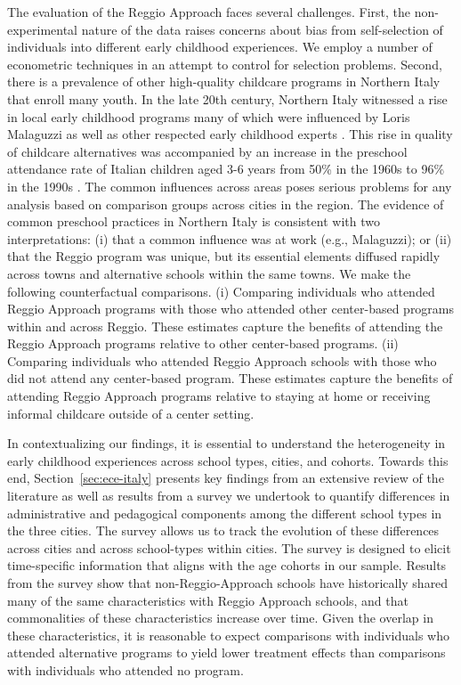 The evaluation of the Reggio Approach faces several challenges. First, the non-experimental nature of the data raises concerns about bias from self-selection of individuals into different early childhood experiences. We employ a number of econometric techniques in an attempt to control for selection problems. Second, there is a prevalence of other high-quality childcare programs in Northern Italy that enroll many youth. In the late 20th century, Northern Italy witnessed a rise in local early childhood programs many of which were influenced by Loris Malaguzzi as well as other respected early childhood experts \citep{OECD_2001_Italy-Country-Note}. This rise in quality of childcare alternatives was accompanied by an increase in the preschool attendance rate of Italian children aged 3-6 years from 50\% in the 1960s to 96\% in the 1990s \citep{Hohnerlein_2015_Development-and-Diffusion}. The common influences across areas poses serious problems for any analysis based on comparison groups across cities in the region.  The evidence of common preschool practices in Northern Italy is consistent with two interpretations: (i) that a common influence was at work (e.g., Malaguzzi); or (ii) that the Reggio program was unique, but its essential elements diffused rapidly across towns and alternative schools within the same towns. We make the following counterfactual comparisons. (i) Comparing individuals who attended Reggio Approach programs with those who attended other center-based programs within and across Reggio. These estimates capture the benefits of attending the Reggio Approach programs relative to other center-based programs. (ii) Comparing individuals who attended Reggio Approach schools with those who did not attend any center-based program. These estimates capture the benefits of attending Reggio Approach programs relative to staying at home or receiving informal childcare outside of a center setting.

In contextualizing our findings, it is essential to understand the heterogeneity in early childhood experiences across school types, cities, and cohorts. Towards this end, Section~\ref{sec:ece-italy} presents key findings from an extensive review of the literature as well as results from a survey we undertook to quantify differences in administrative and pedagogical components among the different school types in the three cities. The survey allows us to track the evolution of these differences across cities and across school-types within cities. The survey is designed to elicit time-specific information that aligns with the age cohorts in our sample. Results from the survey show that non-Reggio-Approach schools have historically shared many of the same characteristics with Reggio Approach schools, and that commonalities of these characteristics increase over time. Given the overlap in these characteristics, it is reasonable to expect comparisons with individuals who attended alternative programs to yield lower treatment effects than comparisons with individuals who attended no program.


